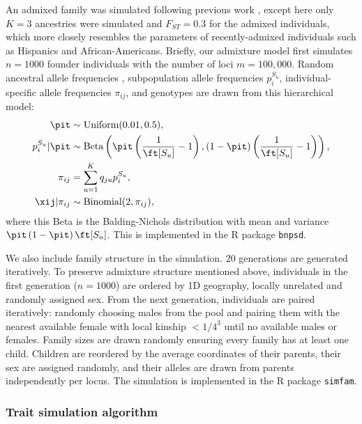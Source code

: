 \documentclass[11pt]{article}
\begin{document}
An admixed family was simulated following previous work \citep{yao_limitations_2022}, except here only $K=3$ ancestries were simulated and $F_{ST}=0.3$ for the admixed individuals, which more closely resembles the parameters of recently-admixed individuals such as Hispanics and African-Americans.
Briefly, our admixture model first simulates $n=1000$ founder individuals with the number of loci $m=100,000$.
Random ancestral allele frequencies \pit, subpopulation allele frequencies $p_i^{S_u}$, individual-specific allele frequencies $\pi_{ij}$, and genotypes \xij are drawn from this hierarchical model:
\begin{align*}
  \pit
  &\sim
    \text{Uniform}( 0.01, 0.5 )
    , \\
  p_i^{S_u} | \pit
  &\sim
    \text{Beta} \left(
    \pit \left( \frac{1}{ \ft[S_u] } - 1 \right),
    \left( 1 - \pit \right) \left( \frac{1}{ \ft[S_u] } - 1 \right)
    \right)
    , \\
  \pi_{ij}
  &=
    \sum_{u = 1}^K q_{ju} p_i^{S_u}
    , \\
  \xij | \pi_{ij}
  &\sim
    \text{Binomial}(2, \pi_{ij})
    ,
\end{align*}
where this Beta is the Balding-Nichols distribution \citep{balding_method_1995} with mean \pit and variance $\pit \left( 1 - \pit \right) \ft[S_u]$.
This is implemented in the R package \texttt{bnpsd}.

We also include family structure in the simulation. 20 generations are generated iteratively. To preserve admixture structure mentioned above, individuals in the first generation ($n=1000$) are ordered by 1D geography, locally unrelated and randomly assigned sex. 
From the next generation, individuals are paired iteratively: randomly choosing males from the pool and pairing them with the nearest available female with local kinship $<1/4^3$ until no available males or females. Family sizes are drawn randomly ensuring every family has at least one child. Children are reordered by the average coordinates of their parents, their sex are assigned randomly, and their alleles are drawn from parents independently per locus. The simulation is implemented in the R package \texttt{simfam}.

\subsubsection{Trait simulation algorithm}
\end{document}
